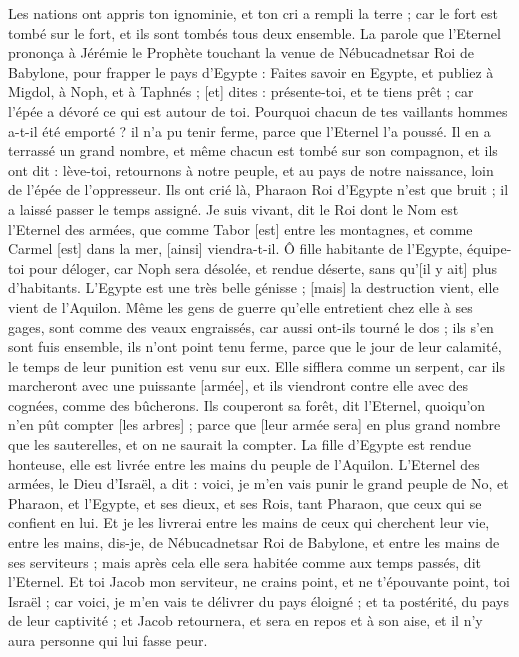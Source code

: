\begin{multicols}{2}
Les nations ont appris ton ignominie, et ton cri a rempli la terre ; car le fort est tombé sur le fort, et ils sont tombés tous deux ensemble.
La parole que l'Eternel prononça à Jérémie le Prophète touchant la venue de Nébucadnetsar Roi de Babylone, pour frapper le pays d'Egypte :
Faites savoir en Egypte, et publiez à Migdol, à Noph, et à Taphnés ; [et] dites : présente-toi, et te tiens prêt ; car l'épée a dévoré ce qui est autour de toi.
Pourquoi chacun de tes vaillants hommes a-t-il été emporté ? il n'a pu tenir ferme, parce que l'Eternel l'a poussé.
Il en a terrassé un grand nombre, et même chacun est tombé sur son compagnon, et ils ont dit : lève-toi, retournons à notre peuple, et au pays de notre naissance, loin de l'épée de l'oppresseur.
Ils ont crié là, Pharaon Roi d'Egypte n'est que bruit ; il a laissé passer le temps assigné.
Je suis vivant, dit le Roi dont le Nom est l'Eternel des armées, que comme Tabor [est] entre les montagnes, et comme Carmel [est] dans la mer, [ainsi] viendra-t-il.
Ô fille habitante de l'Egypte, équipe-toi pour déloger, car Noph sera désolée, et rendue déserte, sans qu'[il y ait] plus d'habitants.
L'Egypte est une très belle génisse ; [mais] la destruction vient, elle vient de l'Aquilon.
Même les gens de guerre qu'elle entretient chez elle à ses gages, sont comme des veaux engraissés, car aussi ont-ils tourné le dos ; ils s'en sont fuis ensemble, ils n'ont point tenu ferme, parce que le jour de leur calamité, le temps de leur punition est venu sur eux.
Elle sifflera comme un serpent, car ils marcheront avec une puissante [armée], et ils viendront contre elle avec des cognées, comme des bûcherons.
Ils couperont sa forêt, dit l'Eternel, quoiqu'on n'en pût compter [les arbres] ; parce que [leur armée sera] en plus grand nombre que les sauterelles, et on ne saurait la compter.
La fille d'Egypte est rendue honteuse, elle est livrée entre les mains du peuple de l'Aquilon.
L'Eternel des armées, le Dieu d'Israël, a dit : voici, je m'en vais punir le grand peuple de No, et Pharaon, et l'Egypte, et ses dieux, et ses Rois, tant Pharaon, que ceux qui se confient en lui.
Et je les livrerai entre les mains de ceux qui cherchent leur vie, entre les mains, dis-je, de Nébucadnetsar Roi de Babylone, et entre les mains de ses serviteurs ; mais après cela elle sera habitée comme aux temps passés, dit l'Eternel.
Et toi Jacob mon serviteur, ne crains point, et ne t'épouvante point, toi Israël ; car voici, je m'en vais te délivrer du pays éloigné ; et ta postérité, du pays de leur captivité ; et Jacob retournera, et sera en repos et à son aise, et il n'y aura personne qui lui fasse peur.

\end{multicols}
